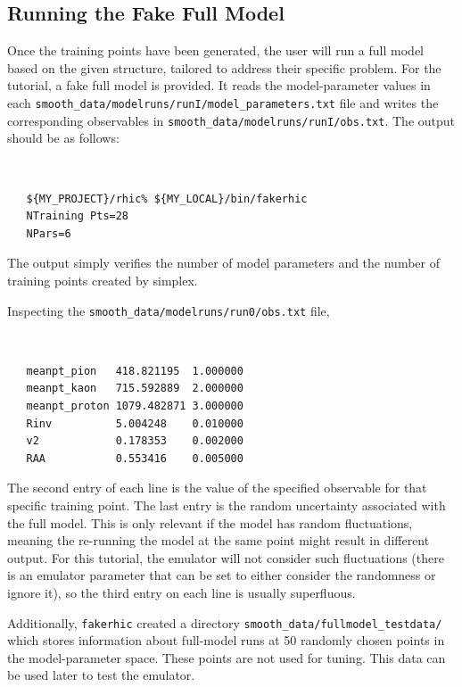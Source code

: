 \documentclass[UserManual.tex]{subfiles}
\begin{document}
\subsection{Running the Fake Full Model}
Once the training points have been generated, the user will run a full model based on the given structure, tailored to address their specific problem. For the tutorial, a fake full model is provided. It reads the model-parameter values in each {\tt smooth\_data/modelruns/runI/model\_parameters.txt} file and writes the corresponding observables in {\tt smooth\_data/modelruns/runI/obs.txt}. The output should be as follows:
{\tt
\begin{verbatim}
   ${MY_PROJECT}/rhic% ${MY_LOCAL}/bin/fakerhic
   NTraining Pts=28
   NPars=6
\end{verbatim}
}
The output simply verifies the number of model parameters and the number of training points created by simplex.

Inspecting the {\tt smooth\_data/modelruns/run0/obs.txt} file,
{\tt
\begin{verbatim}
   meanpt_pion   418.821195  1.000000
   meanpt_kaon   715.592889  2.000000
   meanpt_proton 1079.482871 3.000000
   Rinv          5.004248    0.010000
   v2            0.178353    0.002000
   RAA           0.553416    0.005000
\end{verbatim}
}
The second entry of each line is the value of the specified observable for that specific training point. The last entry is the random uncertainty associated with the full model. This is only relevant if the model has random fluctuations, meaning the re-running the model at the same point might result in different output. For this tutorial, the emulator will not consider such fluctuations (there is an emulator parameter that can be set to either consider the randomness or ignore it), so the third entry on each line is usually superfluous. 

Additionally, {\tt fakerhic} created a directory {\tt smooth\_data/fullmodel\_testdata/} which stores information about full-model runs at 50 randomly chosen points in the model-parameter space. These points are not used for tuning. This data can be used later to test the emulator. 
\end{document}
